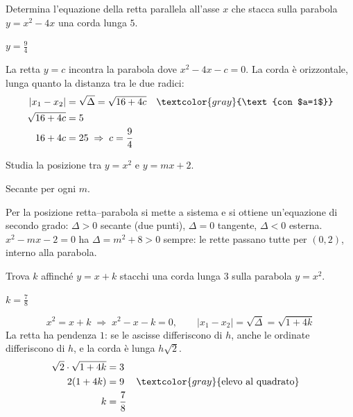 
\begin{question}[ID=2.8, subtitle={Retta con corda di lunghezza 5 su $y=x^2-4x$}, difficulty=difficile, tags={parabola, corda}]
Determina l'equazione della retta parallela all'asse $x$ che stacca sulla parabola $y=x^2-4x$ una corda lunga $5$.
\begin{solution}
$y=\tfrac94$
\end{solution}
\begin{explanation}
La retta $y=c$ incontra la parabola dove $x^2-4x-c=0$. La corda è orizzontale, lunga quanto la distanza tra le due radici:
\[\begin{aligned}
|x_1-x_2| &= \sqrt{\Delta}=\sqrt{16+4c} && \textcolor{gray}{\text{con $a=1$}}\\
\sqrt{16+4c} &= 5\\
16+4c &= 25 \;\Rightarrow\; c=\dfrac94
\end{aligned}\]
\end{explanation}
\end{question}


\begin{question}[ID=2.9, subtitle={Posizione di $y=x^2$ e $y=mx+2$ al variare di $m$}, difficulty=difficile, tags={parabola, parametrico}]
Studia la posizione tra $y=x^2$ e $y=mx+2$.
\begin{solution}
Secante per ogni $m$.
\end{solution}
\begin{explanation}
Per la posizione retta–parabola si mette a sistema e si ottiene un'equazione di secondo grado: $\Delta>0$ secante (due punti), $\Delta=0$ tangente, $\Delta<0$ esterna.
$x^2-mx-2=0$ ha $\Delta=m^2+8>0$ sempre: le rette passano tutte per $(0,2)$, interno alla parabola.
\end{explanation}
\end{question}


\begin{question}[ID=2.10, subtitle={Valore di $k$ affinché $y=x+k$ stacchi corda lunga 3 su $y=x^2$}, difficulty=difficile, tags={parabola, corda, parametrico}]
Trova $k$ affinché $y=x+k$ stacchi una corda lunga $3$ sulla parabola $y=x^2$.
\begin{solution}
$k=\tfrac78$
\end{solution}
\begin{explanation}
\[ x^2=x+k \;\Rightarrow\; x^2-x-k=0, \qquad |x_1-x_2|=\sqrt{\Delta}=\sqrt{1+4k} \]
La retta ha pendenza $1$: se le ascisse differiscono di $h$, anche le ordinate differiscono di $h$, e la corda è lunga $h\sqrt2$.
\[\begin{aligned}
\sqrt2\cdot\sqrt{1+4k} &= 3\\
2(1+4k) &= 9 && \textcolor{gray}{\text{elevo al quadrato}}\\
k &= \dfrac78
\end{aligned}\]
\end{explanation}
\end{question}

